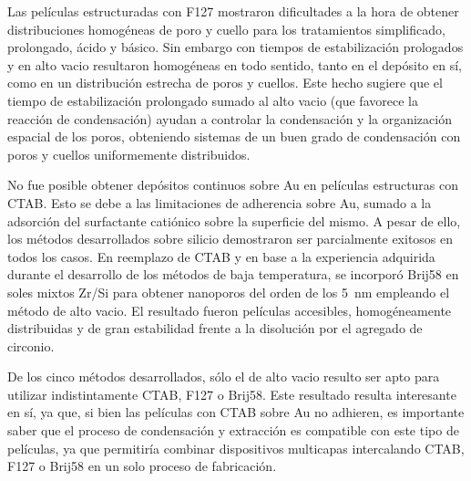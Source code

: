 	Las películas estructuradas con F127 mostraron dificultades a la hora de obtener distribuciones homogéneas de poro y cuello para los tratamientos simplificado, prolongado, ácido y básico. Sin embargo con tiempos de estabilización prologados y en alto vacio resultaron homogéneas en todo sentido, tanto en el depósito en sí, como en un distribución estrecha de poros y cuellos. Este hecho sugiere que el tiempo de estabilización prolongado sumado al alto vacio (que favorece la reacción de condensación) ayudan a controlar la condensación y la organización espacial de los poros, obteniendo sistemas de un buen grado de condensación con poros y cuellos uniformemente distribuidos.

	No fue posible obtener depósitos continuos sobre Au en películas estructuras con CTAB. Esto se debe a las limitaciones de adherencia sobre Au, sumado a la adsorción del surfactante catiónico sobre la superficie del mismo. A pesar de ello, los métodos desarrollados sobre silicio demostraron ser parcialmente exitosos en todos los casos. En reemplazo de CTAB y en base a la experiencia adquirida durante el desarrollo de los métodos de baja temperatura, se incorporó Brij58 en soles mixtos Zr/Si para obtener nanoporos del orden de los \SI{5}{\nm} empleando el método de alto vacio. El resultado fueron películas accesibles, homogéneamente distribuidas y de gran estabilidad frente a la disolución por el agregado de circonio. 

	De los cinco métodos desarrollados, sólo el de alto vacio resulto ser apto para utilizar indistintamente CTAB, F127 o Brij58. Este resultado resulta interesante en sí, ya que, si bien las películas con CTAB sobre Au no adhieren, es importante saber que el proceso de condensación y extracción es compatible con este tipo de películas, ya que permitiría combinar dispositivos multicapas intercalando CTAB, F127 o Brij58 en un solo proceso de fabricación.


